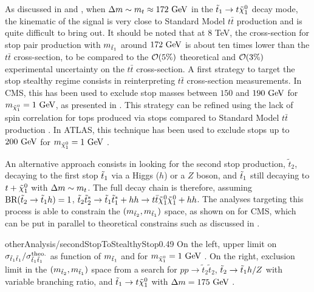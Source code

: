     As discussed in  and ,
    when $\Delta m \sim m_{t} \approx 172~\text{GeV}$ in the $\tilde{t}_1 \rightarrow t \tilde{\chi}_1^0$
    decay mode, the kinematic of the signal is very close to Standard Model $t\bar{t}$ production
    and is quite difficult to bring out. It should be noted that at 8 TeV, the cross-section
    for stop pair production with $m_{\tilde{t}_1}$ around $172~\text{GeV}$ is about ten times lower
    than the $t\bar{t}$ cross-section, to be compared to the $\mathcal{O}(5\%)$ theoretical
    and $\mathcal{O}(3\%)$ experimental uncertainty on the $t\bar{t}$ cross-section. A first
    strategy to target the stop stealthy regime consists in reinterpreting $t\bar{t}$
    cross-section measurements. In CMS, this has been used to exclude stop masses between
    $150$ and $190~\text{GeV}$ for $m_{\tilde{\chi}_1^0} = 1~\text{GeV}$, as presented in 
    \cite{topCrossSectionMeasurement}. This
    strategy can be refined using the lack of spin correlation for tops produced via
    stops compared to Standard Model $t\bar{t}$ production \cite{LightStopSigns}.
    In ATLAS, this technique has been used to exclude stops up to $200~\text{GeV}$ for
    $m_{\tilde{\chi}_1^0} = 1~\text{GeV}$ \cite{ATLASstealthyStops}.

    An alternative approach consists in looking for the second stop production, $\tilde{t}_2$,
    decaying to the first stop $\tilde{t}_1$ via a Higgs ($h$) or a $Z$ boson, and $\tilde{t}_1$ still decaying
    to $t + \tilde{\chi}_1^0$ with $\Delta m \sim m_{t}$. The full decay chain is therefore,
    assuming $\text{BR}(\tilde{t}_2 \rightarrow \tilde{t}_1 h) = 1$,
    $\tilde{t}_2 \tilde{t}^*_2 \rightarrow \tilde{t}_1 \tilde{t}_1^* + hh \rightarrow t\bar{t} \tilde{\chi}_1^0 \tilde{\chi}_1^0 + hh$.
    The analyses \cite{SUS-13-024, ATLASstopSearches} targeting this process is able to
    constrain the $(m_{\tilde{t}_2},m_{\tilde{t}_1})$ space, as shown on
     for CMS, which can be put in parallel to theoretical
    constrains such as discussed in .

                                {otherAnalysis/secondStopToStealthyStop}{0.49}{
                                On the left, upper limit on $\sigma_{\tilde{t}_1\tilde{t}_1} / \sigma^\text{theo.}_{\tilde{t}_1\tilde{t}_1}$
                                as function of $m_{\tilde{t}_1}$ and for $m_{\tilde{\chi}_1^0} = 1~\text{GeV}$ \cite{topCrossSectionMeasurement}. On the right,
                                exclusion limit in the $(m_{\tilde{t}_2},m_{\tilde{t}_1})$ space from a search for
                                $pp \rightarrow \tilde{t}_2\tilde{t}_2$, $\tilde{t}_2 \rightarrow \tilde{t}_1 h/Z$ with
                                variable branching ratio, and $\tilde{t}_1 \rightarrow t \tilde{\chi}_1^0$ with $\Delta m = 175~\text{GeV}$ \cite{SUS-13-024}.}

